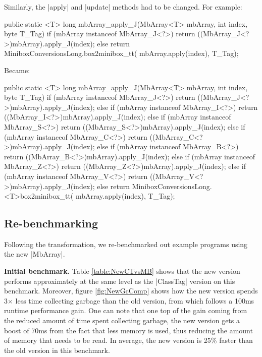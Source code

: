 Similarly, the |apply| and |update| methods had to be changed.
For example:

\begin{lstlisting-nobreak-java}
public static <T> long mbArray_apply_J(MbArray<T> mbArray, int index, byte T_Tag) {
  if (mbArray instanceof MbArray_J<?>)
    return ((MbArray_J<?>)mbArray).apply_J(index);
  else
    return MiniboxConversionsLong.box2minibox_tt(
    	mbArray.apply(index), T_Tag);
}
\end{lstlisting-nobreak-java}

Became:

\begin{lstlisting-nobreak-java}
public static <T> long mbArray_apply_J(MbArray<T> mbArray, int index, byte T_Tag) {
  if (mbArray instanceof MbArray_J<?>)
    return ((MbArray_J<?>)mbArray).apply_J(index);
  else if (mbArray instanceof MbArray_I<?>)
    return ((MbArray_I<?>)mbArray).apply_J(index);
  else if (mbArray instanceof MbArray_S<?>)
    return ((MbArray_S<?>)mbArray).apply_J(index);
  else if (mbArray instanceof MbArray_C<?>)
    return ((MbArray_C<?>)mbArray).apply_J(index);
  else if (mbArray instanceof MbArray_B<?>)
    return ((MbArray_B<?>)mbArray).apply_J(index);
  else if (mbArray instanceof MbArray_Z<?>)
    return ((MbArray_Z<?>)mbArray).apply_J(index);
  else if (mbArray instanceof MbArray_V<?>)
    return ((MbArray_V<?>)mbArray).apply_J(index);
  else
    return MiniboxConversionsLong.<T>box2minibox_tt(
    	mbArray.apply(index), T_Tag);
}
\end{lstlisting-nobreak-java}

\subsection{Re-benchmarking}

Following the transformation, we re-benchmarked out example programs using the new |MbArray|.
 
\textbf{Initial benchmark.} Table \ref{table:NewCTvsMB} shows that the new version performs approximately at the same level as the |ClassTag| version on this benchmark. Moreover, figure \ref{fig:NewGcComp} shows how the new version spends 3$\times$ less time collecting garbage than the old version, from which follows a 100ms runtime performance gain. One can note that one top of the gain coming from the reduced amount of time spent collecting garbage, the new version gets a boost of 70ms from the fact that less memory is used, thus reducing the amount of memory that needs to be read. In average, the new version is 25\% faster than the old version in this benchmark.

